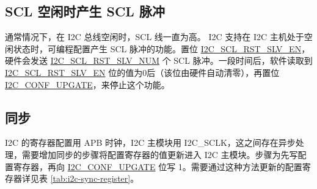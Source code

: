 \documentclass[main\_\_CN.tex]{subfiles}
\begin{document}
\subsection{SCL 空闲时产生 SCL 脉冲}
通常情况下，在 I2C 总线空闲时，SCL 线一直为高。\chipname{} I2C 支持在 I2C 主机处于空闲状态时，可编程配置产生 SCL 脉冲的功能。置位 \hyperref[fielddesc:I2CSCLRSTSLVEN]{I2C\_SCL\_RST\_SLV\_EN}，硬件会发送 \hyperref[fielddesc:I2CSCLRSTSLVNUM]{I2C\_SCL\_RST\_SLV\_NUM} 个 SCL 脉冲。一段时间后，软件读取到 \hyperref[fielddesc:I2CSCLRSTSLVEN]{I2C\_SCL\_RST\_SLV\_EN} 位的值为0后（该位由硬件自动清零），再置位 \hyperref[fielddesc:I2CCONFUPGATE]{I2C\_CONF\_UPGATE}，来停止这个功能。

\subsection{同步}
I2C 的寄存器配置用 APB 时钟，I2C 主模块用 I2C\_SCLK，这之间存在异步处理，需要增加同步的步骤将配置寄存器的值更新进入 I2C 主模块。步骤为先写配置寄存器，再向 \hyperref[fielddesc:I2CCONFUPGATE]{I2C\_CONF\_UPGATE} 位写 1。需要通过这种方法更新的配置寄存器详见表 \ref{tab:i2c-sync-register}。
\end{document}

